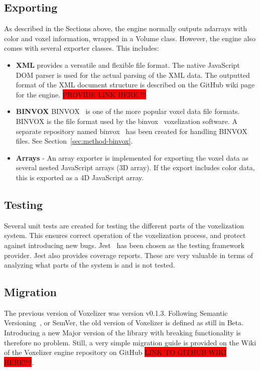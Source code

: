 \subsection{Exporting}
As described in the Sections above, the engine normally outputs ndarrays with color and voxel information, wrapped in a Volume class. However, the engine also comes with several exporter classes. This includes:
\begin{itemize}
    \item \textbf{XML} provides a versatile and flexible file format. The native JavaScript DOM parser is used for the actual parsing of the XML data. The outputted format of the XML document structure is described on the GitHub wiki page for the engine.
    \colorbox{red}{PROVIDE LINK HERE !!!}
    \item \textbf{BINVOX} BINVOX~\cite{binvox-file-format} is one of the more popular voxel data file formats. BINVOX is the file format used by the binvox~\cite{binvox} voxelization software. A separate repository named binvox~\cite{andstor-binvox} has been created for handling BINVOX files. See Section~\ref{sec:method-binvox}.
    \item \textbf{Arrays} - An array exporter is implemented for exporting the voxel data as several nested JavaScript arrays (3D array). If the export includes color data, this is exported as a 4D JavaScript array.
\end{itemize}

\subsection{Testing}
Several unit tests are created for testing the different parts of the voxelization system. This ensures correct operation of the voxelization process, and protect against introducing new bugs. Jest~\cite{jest} has been chosen as the testing framework provider. Jest also provides coverage reports. These are very valuable in terms of analyzing what parts of the system is and is not tested.

\subsection{Migration}
The previous version of Voxelizer was version v0.1.3. Following Semantic Versioning~\cite{semantic-versioning}, or SemVer, the old version of Voxelizer is defined as still in Beta. Introducing a new Major version of the library with breaking functionality is therefore no problem. Still, a very simple migration guide is provided on the Wiki of the Voxelizer engine repository on GitHub \colorbox{red}{LINK TO GITHUB WIKI HERE!!!!}.

